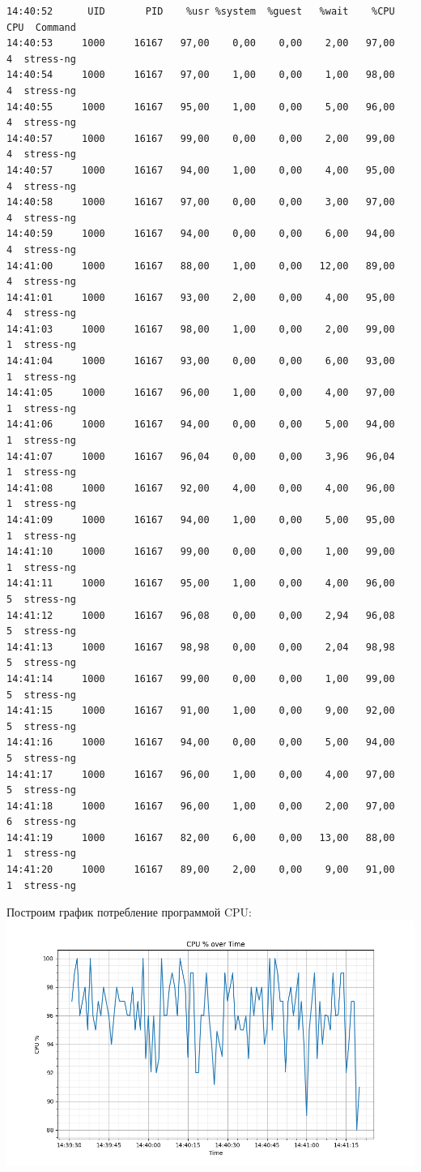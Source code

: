 \begin{verbatim}
14:40:52      UID       PID    %usr %system  %guest   %wait    %CPU   CPU  Command
14:40:53     1000     16167   97,00    0,00    0,00    2,00   97,00     4  stress-ng
14:40:54     1000     16167   97,00    1,00    0,00    1,00   98,00     4  stress-ng
14:40:55     1000     16167   95,00    1,00    0,00    5,00   96,00     4  stress-ng
14:40:57     1000     16167   99,00    0,00    0,00    2,00   99,00     4  stress-ng
14:40:57     1000     16167   94,00    1,00    0,00    4,00   95,00     4  stress-ng
14:40:58     1000     16167   97,00    0,00    0,00    3,00   97,00     4  stress-ng
14:40:59     1000     16167   94,00    0,00    0,00    6,00   94,00     4  stress-ng
14:41:00     1000     16167   88,00    1,00    0,00   12,00   89,00     4  stress-ng
14:41:01     1000     16167   93,00    2,00    0,00    4,00   95,00     4  stress-ng
14:41:03     1000     16167   98,00    1,00    0,00    2,00   99,00     1  stress-ng
14:41:04     1000     16167   93,00    0,00    0,00    6,00   93,00     1  stress-ng
14:41:05     1000     16167   96,00    1,00    0,00    4,00   97,00     1  stress-ng
14:41:06     1000     16167   94,00    0,00    0,00    5,00   94,00     1  stress-ng
14:41:07     1000     16167   96,04    0,00    0,00    3,96   96,04     1  stress-ng
14:41:08     1000     16167   92,00    4,00    0,00    4,00   96,00     1  stress-ng
14:41:09     1000     16167   94,00    1,00    0,00    5,00   95,00     1  stress-ng
14:41:10     1000     16167   99,00    0,00    0,00    1,00   99,00     1  stress-ng
14:41:11     1000     16167   95,00    1,00    0,00    4,00   96,00     5  stress-ng
14:41:12     1000     16167   96,08    0,00    0,00    2,94   96,08     5  stress-ng
14:41:13     1000     16167   98,98    0,00    0,00    2,04   98,98     5  stress-ng
14:41:14     1000     16167   99,00    0,00    0,00    1,00   99,00     5  stress-ng
14:41:15     1000     16167   91,00    1,00    0,00    9,00   92,00     5  stress-ng
14:41:16     1000     16167   94,00    0,00    0,00    5,00   94,00     5  stress-ng
14:41:17     1000     16167   96,00    1,00    0,00    4,00   97,00     5  stress-ng
14:41:18     1000     16167   96,00    1,00    0,00    2,00   97,00     6  stress-ng
14:41:19     1000     16167   82,00    6,00    0,00   13,00   88,00     1  stress-ng
14:41:20     1000     16167   89,00    2,00    0,00    9,00   91,00     1  stress-ng
\end{verbatim}
Построим график потребление программой CPU:\\
\includegraphics[width=\textwidth]{image/cpu_usage.png}

